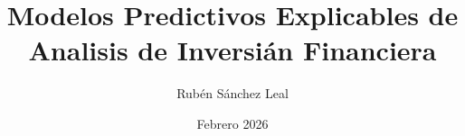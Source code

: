 \newcommand{\Estudios}{Grado}

\newcommand{\TituloEstudios}{Ingeniería Informática}

\newcommand{\Departamento}{Departamento de Inteligencia Artificial}

\newcommand{\NombreAutor}{Rubén Sánchez Leal}

\newcommand{\NombreTutor}{Juan Antonio Fernández del Pozo de Salamanca}

\newcommand{\TituloTFG}{Modelos Predictivos Explicables de Analisis de Inversián Financiera}

\newcommand{\Fecha}{Febrero 2026}

\title{\TituloTFG}
\author{\NombreAutor}
\date{\Fecha}

